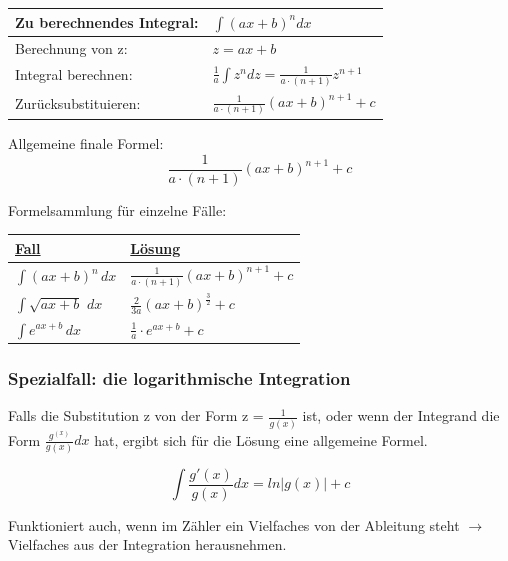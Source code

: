 \documentclass[12pt]{scrartcl}
\begin{document}
\renewcommand{\arraystretch}{1.5}
\begin{center}
    \begin{tabular}{ | m{18em} | m{18em} | }
        \hline
        Zu berechnendes Integral: & $\int (ax + b)^n dx$ \\ 
        \hline
        Berechnung von z:  & $z = ax + b$ \\ 
        \hline
        Integral berechnen:  & $\frac{1}{a}\int z^n dz = \frac{1}{a \cdot (n+1)}z^{n+1}$ \\ 
        \hline
        Zurücksubstituieren: & $\frac{1}{a \cdot (n + 1)}(ax+b)^{n + 1} + c$ \\
        \hline
    \end{tabular}
\end{center}

Allgemeine finale Formel:
\[ \frac{1}{a \cdot (n + 1)}(ax+b)^{n + 1} + c\]


Formelsammlung für einzelne Fälle:
\renewcommand{\arraystretch}{1.5}
\begin{center}
    \begin{tabular}{ | m{18em} | m{18em} | }
        \hline
        \textbf{\underline{Fall}} & \textbf{\underline{Lösung}} \\ 
        \hline
        $\int (ax + b)^n \, dx$  & $\frac{1}{a \cdot (n+1)}(ax + b)^{n+1} + c$ \\ 
        \hline
        $\int \sqrt{ax + b} \,\,dx$  & $\frac{2}{3a}(ax + b)^{\frac{3}{2}} + c$ \\ 
        \hline
        $\int e^{ax + b} \, dx$ & $\frac{1}{a} \cdot e^{ax + b} + c$ \\
        \hline
    \end{tabular}
\end{center}



\subsubsection{Spezialfall: die logarithmische Integration}
Falls die Substitution z von der Form z = $\frac{1}{g(x)}$ ist, oder wenn der Integrand
die Form $\frac{g^(x)}{g(x)} dx$ hat, ergibt sich für die Lösung eine allgemeine Formel.

\[\int \frac{g'(x)}{g(x)} dx = ln|g(x)| + c\]

Funktioniert auch, wenn im Zähler ein Vielfaches von der Ableitung steht $\rightarrow$ Vielfaches 
aus der Integration herausnehmen.
\end{document}
